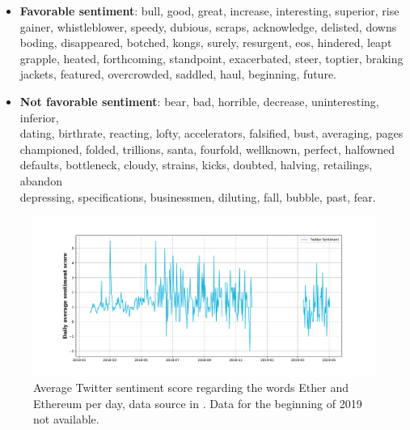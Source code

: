 \begin{itemize}
	\item \textbf{Favorable sentiment}:
	bull, good, great, increase, interesting, superior, rise\\
	gainer, whistleblower, speedy, dubious, scraps, acknowledge, delisted, downs\\
	boding, disappeared, botched, kongs, surely, resurgent, eos, hindered, leapt\\
	grapple, heated, forthcoming, standpoint, exacerbated, steer, toptier, braking\\
	jackets, featured, overcrowded, saddled, haul, beginning, future.
	\item \textbf{Not favorable sentiment}:
	bear, bad, horrible, decrease, uninteresting, inferior,\\
	dating, birthrate, reacting, lofty, accelerators, falsified, bust, averaging, pages\\
	championed, folded, trillions, santa, fourfold, wellknown, perfect, halfowned\\
	defaults, bottleneck, cloudy, strains, kicks, doubted, halving, retailings, abandon\\
	depressing, specifications, businessmen, diluting, fall, bubble, past, fear.
	
\end{itemize}

\begin{figure}[htpb!] %
	\centering %
	\includegraphics[width=\textwidth]{data/twitter.pdf} %
	\caption{ Average Twitter sentiment score regarding the words Ether and Ethereum per day, data source in \cite{deepblueai}. Data for the beginning of 2019 not available.} %
	\label{fig:twitter_plot} %
\end{figure}

